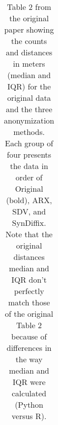 \begin{table}
\begin{center}
\begin{small}
\begin{tabular}{lllll}
      \bottomrule
      \end{tabular}
      \end{small}
      \caption{Table 2 from the original paper showing the counts and distances in meters (median and IQR) for the original data and the three anonymization methods. Each group of four presents the data in order of Original (bold), ARX, SDV, and SynDiffix. Note that the original distances median and IQR don't perfectly match those of the original Table 2 because of differences in the way median and IQR were calculated (Python versus R).}
      \label{tab:table2}
      \end{center}
      \end{table}
      \setlength{\fboxsep}{3pt}
    